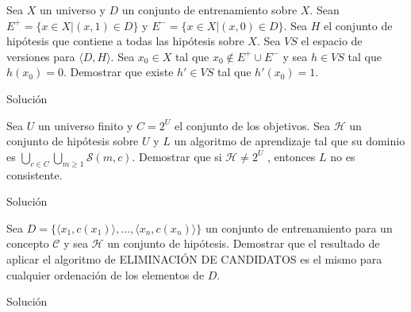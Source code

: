 \documentclass{mulcia_aa}
\begin{document}
\genTitle

\begin{problem}
Sea $X$ un universo y $D$ un conjunto de entrenamiento sobre $X$. Sean $E^+ = \{ x \in X |(x, 1) \in D \}$ y $E^- = \{x \in X |(x, 0) \in D\}$. Sea $H$ el conjunto de hipótesis que contiene a todas las hipótesis sobre $X$. Sea $VS$ el espacio de versiones para $ \langle D, H \rangle$. Sea $x_0 \in X$ tal que $x_0 \not\in E^+ \cup E^- $ y sea $h \in VS$ tal que $h(x_0) = 0$. Demostrar que existe $h' \in VS$ tal que $h'(x_0) = 1$.
\end{problem}
\begin{solution}
Solución
\end{solution}

\begin{problem}
Sea $U$ un universo finito y $C = 2^U$ el conjunto de los objetivos. Sea $\mathcal{H}$ un conjunto de hipótesis sobre $U$ y $L$ un algoritmo de aprendizaje tal que su dominio es $\bigcup_{c \in C}\bigcup_{m \geq 1} \mathcal{S}(m, c)$. Demostrar que si $\mathcal{H} \not= 2^U$ , entonces $L$ no es consistente.
\end{problem}
\begin{solution}
Solución
\end{solution}

\begin{problem}
Sea $D = \{\langle x_1, c(x_1)\rangle, . . . ,\langle x_n, c(x_n)\rangle\}$ un conjunto de entrenamiento para un concepto $\mathcal{C}$ y sea $\mathcal{H}$ un conjunto de hipótesis. Demostrar que el resultado de aplicar el algoritmo de ELIMINACIÓN DE CANDIDATOS es el mismo para cualquier ordenación de los elementos de $D$.
\end{problem}
\begin{solution}
Solución
\end{solution}
 
\end{document}
